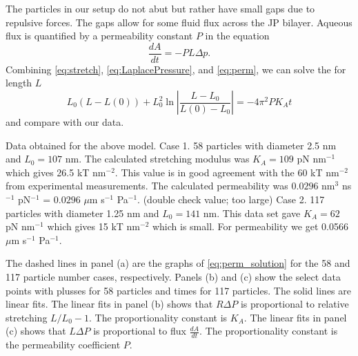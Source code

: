 \documentclass[lineno]{jfm}
\begin{document}
The particles in our setup do not abut but rather have small gaps due to repulsive forces.
The gaps allow for some fluid flux across the JP bilayer.  Aqueous flux is quantified by a permeability constant $P$ in the equation
\begin{equation}
\label{eq:perm}
\frac{dA}{dt} = -P  L \Delta p.
\end{equation}
Combining \eqref{eq:stretch}, \eqref{eq:LaplacePressure}, and \eqref{eq:perm}, we can solve the for length $L$ 
\begin{equation}
\label{eq:perm_solution}
L_0(L-L(0)) + L_0^2 \ln\left|\frac{L-L_0}{L(0)-L_0}\right| = -4\pi^2 P K_A t
\end{equation}
and compare with our data.

Data obtained for the above model.
Case 1. 58 particles with diameter 2.5 nm and $L_0 = 107$ nm. The calculated stretching modulus was $K_A = 109$ pN nm$^{-1}$ which gives 26.5 kT nm$^{-2}$.
This value is in good agreement with the 60 kT nm$^{-2}$ from experimental measurements.  The calculated permeability was 
$0.0296$ nm$^3$ ns$^{-1}$ pN$^{-1}$ = 
$0.0296$ $\mu$m s$^{-1}$ Pa$^{-1}$. (double check value; too large)
Case 2. 117 particles with diameter 1.25 nm and $L_0 = 141$ nm. This data set gave  $K_A = 62$ pN nm$^{-1}$ which gives 15 kT nm$^{-2}$ which is small.
For permeability we get 0.0566 $\mu$m s$^{-1}$ Pa$^{-1}$.

The dashed lines in panel (a) are the graphs of \eqref{eq:perm_solution} for the 58 and 117 particle number cases, respectively. 
Panels (b) and (c) show the select data points with plusses for 58 particles and times for 117 particles.  The solid lines are linear fits.
The linear fits in panel (b) shows that $R\Delta P$ is proportional to relative stretching $L/L_0 - 1$. The proportionality constant is $K_A.$
The linear fits in panel (c) shows that $L\Delta P$ is proportional to flux $\frac{dA}{dt}$.  The proportionality constant is the permeability coefficient $P.$
\end{document}
